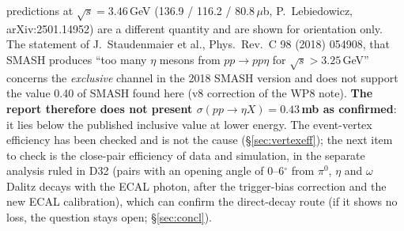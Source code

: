 \documentclass[11pt,a4paper]{article}
\newcommand{\piz}{\ensuremath{\pi^{0}}\xspace}
\newcommand{\sigeta}{\ensuremath{\sigma(pp\to\eta X)}\xspace}
\newcommand{\tabin}[1]{}
\begin{document}
predictions at $\sqrt{s}=3.46$\,GeV (136.9 / 116.2 / 80.8\,$\mu$b, P.~Lebiedowicz, arXiv:2501.14952) are a different quantity and are shown for
orientation only. The statement of J.~Staudenmaier et al., Phys.\ Rev.\ C 98 (2018) 054908, that SMASH produces ``too many $\eta$ mesons from
$pp\to pp\eta$ for $\sqrt{s}>3.25$\,GeV'' concerns the \emph{exclusive} channel in the 2018 SMASH version and does not support the value 0.40 of
SMASH found here (v8 correction of the WP8 note). \textbf{The report therefore does not present $\sigeta=0.43$\,mb as confirmed}: it lies
below the published inclusive value at lower energy. The event-vertex efficiency has been checked and is not the cause
(\S\ref{sec:vertexeff}); the next item to check is the close-pair efficiency of data and simulation, in the separate analysis ruled in D32
(pairs with an opening angle of 0--6$^\circ$ from \piz, $\eta$ and $\omega$ Dalitz decays with the ECAL photon, after the trigger-bias correction
and the new ECAL calibration), which can confirm the direct-decay route (if it shows no loss, the question stays open; \S\ref{sec:concl}).

\tabin{fix2_tableP2_corr.tex}
\end{document}
